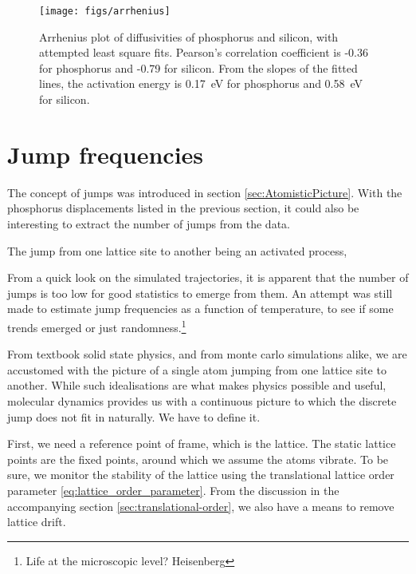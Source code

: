 \documentclass[11pt,bibliography=totoc,index=totoc]{scrbook}   %
\begin{document}
\begin{figure}[htp]
  \centering
  \texttt{[image: figs/arrhenius]}
  \caption{Arrhenius plot of diffusivities of phosphorus and silicon, with attempted least square fits. 
      Pearson's correlation coefficient is -0.36 for phosphorus and -0.79 for silicon.
      From the slopes of the fitted lines, the activation energy is 0.17~eV for phosphorus and 0.58~eV for silicon.
  }
  \label{fig:arrhenius}
\end{figure}





%
\section{Jump frequencies}
%

The concept of jumps was introduced in section \ref{sec:AtomisticPicture}. 
With the phosphorus displacements listed in the previous section, it could also be interesting to extract the number of jumps from the data.

The jump from one lattice site to another being an activated process, 

From a quick look on the simulated trajectories, it is apparent that the number of jumps is too low for good statistics to emerge from them.
An attempt was still made to estimate jump frequencies as a function of temperature, to see if some trends emerged or just randomness.\footnote{
Life at the microscopic level? Heisenberg}

From textbook solid state physics, and from monte carlo simulations alike, we are accustomed with the picture of a single atom jumping from one lattice site to another. 
While such idealisations are what makes physics possible and useful, molecular dynamics provides us with a continuous picture to which the discrete jump does not fit in naturally. 
We have to define it.

First, we need a reference point of frame, which is the lattice. The static lattice points are the fixed points, around which we assume the atoms vibrate.
To be sure, we monitor the stability of the lattice using the translational lattice order parameter \eqref{eq:lattice_order_parameter}. From the discussion in the accompanying section \ref{sec:translational-order}, we also have a means to remove lattice drift.
\end{document}
